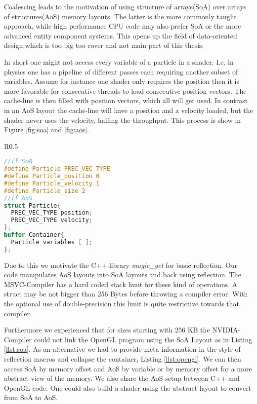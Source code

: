 \documentclass[m,times]{cgMA}
\begin{document}
Coalescing leads to the motivation of using structure of arrays(SoA) over arrays of structures(AoS) memory layouts. The latter is the more commonly taught approach, while high performance CPU code may also prefer SoA or the more advanced entity component systems. This opens up the field of data-oriented design which is too big too cover and not main part of this thesis.

In short one might not access every variable of a particle in a shader. I.e. in physics one has a pipeline of different passes each requiring another subset of variables. Assume for instance one shader only requires the position then it is more favorable for consecutive threads to load consecutive position vectors. The cache-line is then filled with position vectors, which all will get used. In contrast in an AoS layout the cache-line will have a position and a velocity loaded, but the shader never uses the velocity, halfing the throughput. This process is show in Figure \ref{fig:soa} and \ref{fig:aos}.

\noindent\begin{wrapfigure}{R}{0.5\textwidth}
\hfill\begin{minipage}{0.45\textwidth}
\begin{lstlisting}[caption={OpenGL Layout},label={llst:opengl},language={GLSL},style={GL}]
//if SoA
#define Particle PREC_VEC_TYPE
#define Particle_position 0
#define Particle_velocity 1
#define Particle_size 2
//if AoS
struct Particle{
  PREC_VEC_TYPE position;
  PREC_VEC_TYPE velocity;
};
buffer Container{
  Particle variables [ ];
};
\end{lstlisting}
\end{minipage}
\end{wrapfigure}

Due to this we motivate the C++-library \textit{magic\_get} \cite{APOLUKHIN:MAGIC_GET} for basic reflection. Our code manipulates AoS layouts into SoA layouts and back using reflection. The MSVC-Compiler has a hard coded stack limit for these kind of operations. A struct may be not bigger than 256 Bytes before throwing a compiler error. With the optional use of double-precision this limit is quite restrictive towards that compiler.

Furthermore we experienced that for sizes starting with 256 KB the NVIDIA-Compiler could not link the OpenGL program using the SoA Layout as in Listing \ref{llst:soa}. As an alternative we had to provide meta information in the style of reflection macros and collapse the container, Listing \ref{llst:opengl}. We can then access SoA by memory offset and AoS by variable or by memory offset for a more abstract view of the memory. We also share the AoS setup between C++ and OpenGL code. One could also build a shader using the abstract layout to convert from SoA to AoS.
\end{document}
